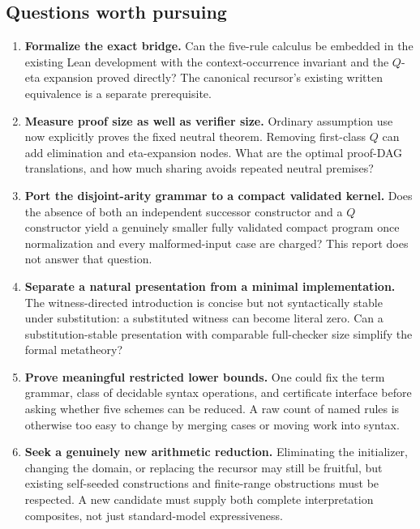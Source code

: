 \documentclass[11pt,letterpaper]{article}
\theoremstyle{definition}\newtheorem{definition}[theorem]{Definition}
\begin{document}
\subsection{Questions worth pursuing}
\begin{enumerate}
\item \textbf{Formalize the exact bridge.} Can the five-rule calculus be embedded in the existing Lean development with the context-occurrence invariant and the $Q$-eta expansion proved directly? The canonical recursor's existing written equivalence is a separate prerequisite.
\item \textbf{Measure proof size as well as verifier size.} Ordinary assumption use now explicitly proves the fixed neutral theorem. Removing first-class $Q$ can add elimination and eta-expansion nodes. What are the optimal proof-DAG translations, and how much sharing avoids repeated neutral premises?
\item \textbf{Port the disjoint-arity grammar to a compact validated kernel.} Does the absence of both an independent successor constructor and a $Q$ constructor yield a genuinely smaller fully validated compact program once normalization and every malformed-input case are charged? This report does not answer that question.
\item \textbf{Separate a natural presentation from a minimal implementation.} The witness-directed introduction is concise but not syntactically stable under substitution: a substituted witness can become literal zero. Can a substitution-stable presentation with comparable full-checker size simplify the formal metatheory?
\item \textbf{Prove meaningful restricted lower bounds.} One could fix the term grammar, class of decidable syntax operations, and certificate interface before asking whether five schemes can be reduced. A raw count of named rules is otherwise too easy to change by merging cases or moving work into syntax.
\item \textbf{Seek a genuinely new arithmetic reduction.} Eliminating the initializer, changing the domain, or replacing the recursor may still be fruitful, but existing self-seeded constructions and finite-range obstructions must be respected. A new candidate must supply both complete interpretation composites, not just standard-model expressiveness.
\end{enumerate}

\appendix
\end{document}
